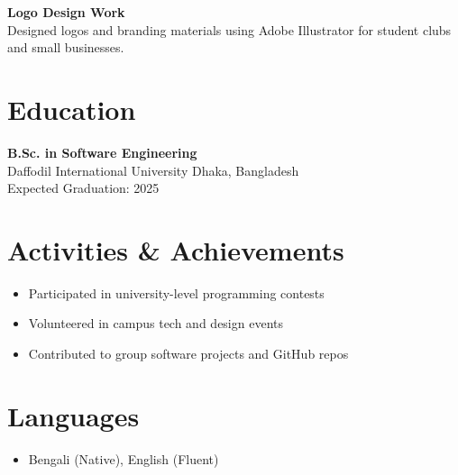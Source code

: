 \documentclass[a4paper,10pt]{article}
\begin{document}
\textbf{Logo Design Work} \\
Designed logos and branding materials using Adobe Illustrator for student clubs and small businesses.

\section*{Education}
\textbf{B.Sc. in Software Engineering} \\
Daffodil International University \hfill Dhaka, Bangladesh \\
Expected Graduation: 2025

\section*{Activities \& Achievements}
\begin{itemize}[noitemsep, topsep=0pt]
    \item Participated in university-level programming contests
    \item Volunteered in campus tech and design events
    \item Contributed to group software projects and GitHub repos
\end{itemize}

\section*{Languages}
\begin{itemize}[noitemsep, topsep=0pt]
    \item Bengali (Native), English (Fluent)
\end{itemize}
\end{document}
